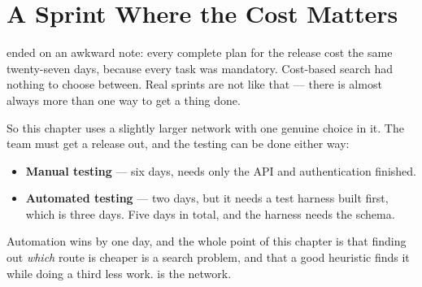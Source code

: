 \section{A Sprint Where the Cost Matters}

 ended on an awkward note: every complete plan for the release
cost the same twenty-seven days, because every task was mandatory. Cost-based
search had nothing to choose between. Real sprints are not like that --- there is
almost always more than one way to get a thing done.

So this chapter uses a slightly larger network with one genuine choice in it. The
team must get a release out, and the testing can be done either way:

\begin{itemize}[leftmargin=2.2em, itemsep=2pt, topsep=4pt]
  \item \textbf{Manual testing} --- six days, needs only the API and authentication
        finished.
  \item \textbf{Automated testing} --- two days, but it needs a test harness built
        first, which is three days. Five days in total, and the harness needs the
        schema.
\end{itemize}

Automation wins by one day, and the whole point of this chapter is that finding out
\emph{which} route is cheaper is a search problem, and that a good heuristic finds
it while doing a third less work.  is the network.

